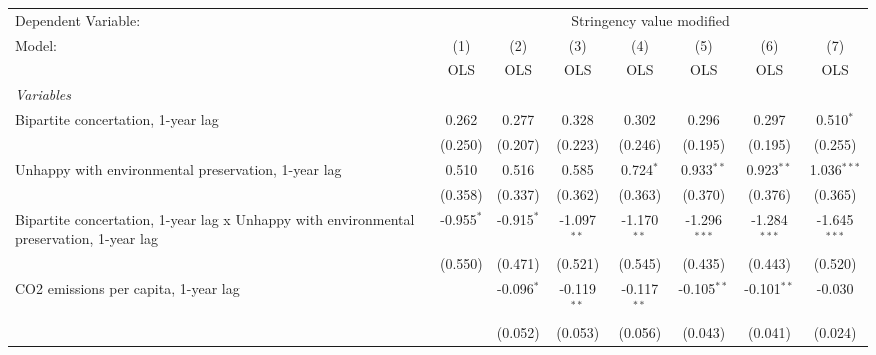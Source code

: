 
\begingroup
\centering
\begin{tabular}{lccccccc}
   \toprule
   Dependent Variable: & \multicolumn{7}{c}{Stringency value modified}\\
   Model:                                                                                   & (1)          & (2)          & (3)           & (4)           & (5)            & (6)            & (7)\\  
                                                                                            &  OLS         & OLS          & OLS           & OLS           & OLS            & OLS            & OLS\\  
   \midrule
   \emph{Variables}\\
   Bipartite concertation, 1-year lag                                                       & 0.262        & 0.277        & 0.328         & 0.302         & 0.296          & 0.297          & 0.510$^{*}$\\   
                                                                                            & (0.250)      & (0.207)      & (0.223)       & (0.246)       & (0.195)        & (0.195)        & (0.255)\\   
   Unhappy with environmental preservation, 1-year lag                                      & 0.510        & 0.516        & 0.585         & 0.724$^{*}$   & 0.933$^{**}$   & 0.923$^{**}$   & 1.036$^{***}$\\   
                                                                                            & (0.358)      & (0.337)      & (0.362)       & (0.363)       & (0.370)        & (0.376)        & (0.365)\\   
   Bipartite concertation, 1-year lag x Unhappy with environmental preservation, 1-year lag & -0.955$^{*}$ & -0.915$^{*}$ & -1.097$^{**}$ & -1.170$^{**}$ & -1.296$^{***}$ & -1.284$^{***}$ & -1.645$^{***}$\\   
                                                                                            & (0.550)      & (0.471)      & (0.521)       & (0.545)       & (0.435)        & (0.443)        & (0.520)\\   
   CO2 emissions per capita, 1-year lag                                                     &              & -0.096$^{*}$ & -0.119$^{**}$ & -0.117$^{**}$ & -0.105$^{**}$  & -0.101$^{**}$  & -0.030\\   
                                                                                            &              & (0.052)      & (0.053)       & (0.056)       & (0.043)        & (0.041)        & (0.024)\\   

\end{tabular}
